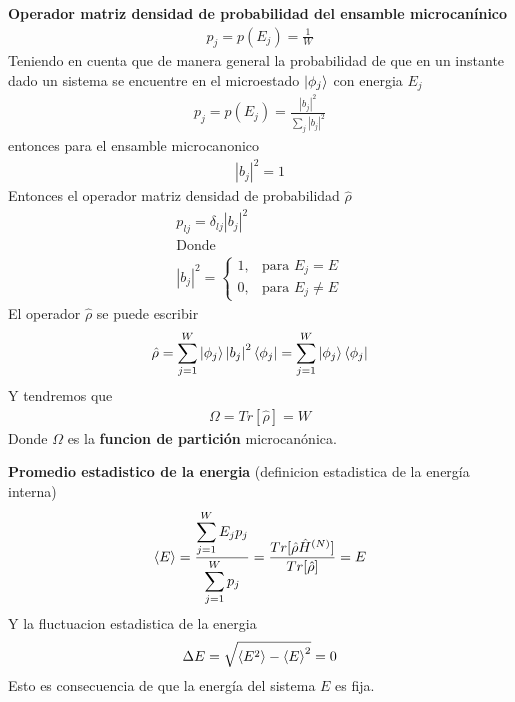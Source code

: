 \documentclass{article}
\begin{document}
\textbf{Operador matriz densidad de probabilidad del ensamble microcanínico } 
\begin{gather*}
  p_j = p(E_j) = \frac{1}{W } 
\end{gather*}
Teniendo en cuenta que de manera general la probabilidad de que en un instante dado un sistema se encuentre en el microestado $ \ket{\phi_j } $ con energia $ E_j  $ 
\begin{gather*}
  p_j = p(E_j ) = \frac{\left|b_j \right|^2 }{\displaystyle\sum_{j }^{} \left|b_j \right|^2 } 
\end{gather*}
entonces para el ensamble microcanonico 
\begin{gather*}
  \left|b_j \right|^2 = 1  
\end{gather*}
Entonces el operador matriz densidad de probabilidad $ \hat \rho $ 
\begin{gather*}
  p _{lj }  = \delta _{lj } \left|b_j \right|^2\\
  \text{Donde }\\
  \left|b_j \right|^2 = 
  \left\{\begin{array}{lr}
      1, &\text{para } E_j = E \\
      0, &\text{para } E_j \neq E
    \end{array}\right.
\end{gather*}
El operador $ \hat \rho $ se puede escribir 
\begin{gather*}
  \hat \rho = \displaystyle\sum_{j=1 }^{W } \ket{\phi_j }\left|b_j \right|^2 \bra{\phi_j } = \displaystyle\sum_{j=1 }^{W } \ket{\phi_j }\bra{\phi_j } 
\end{gather*}
Y tendremos que 
\begin{gather*}
  \Omega = Tr[\hat \rho] = W 
\end{gather*}
Donde $ \Omega  $ es la \textbf{funcion de partición} microcanónica.

\textbf{Promedio estadistico de la energia } (definicion estadistica de la energía interna)
\begin{gather*}
  \expval{E } = \frac{\displaystyle\sum_{j=1 }^{W }E_j p_j }{\displaystyle\sum_{j=1 }^{W } p_j } = \frac{Tr[\hat \rho \hat H ^ {(N )}]}{Tr[\hat \rho]} = E 
\end{gather*}
Y la fluctuacion estadistica de la energia 
\begin{gather*}
  \Delta E = \sqrt{\expval{E^2 } - \expval{E }^2 } = 0 
\end{gather*}
Esto es consecuencia de que la energía del sistema $ E  $ es fija.
\end{document}
